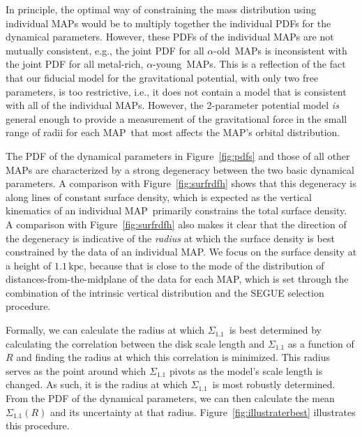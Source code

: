 \documentclass{emulateapj}
\newcommand{\ie}{i.e.}
\renewcommand{\figurename}{Figure}
\newcommand{\apoor}{\ensuremath{\alpha}-young}
\newcommand{\aenhanced}{\ensuremath{\alpha}-old}
\newcommand{\map}{MAP}
\newcommand{\kpc}{\ensuremath{\,\mathrm{kpc}}}
\newcommand{\sigoneone}{\ensuremath{\Sigma_{1.1}}}
\begin{document}
In principle, the optimal way of constraining the mass distribution
using individual \map s would be to multiply together the individual
PDFs for the dynamical parameters. However, these PDFs of the
individual \map s are not mutually consistent, e.g., the joint PDF for
all \aenhanced\ \map s is inconsistent with the joint PDF for all
metal-rich, \apoor\ \map s. This is a reflection of the fact that our
fiducial model for the gravitational potential, with only two free
parameters, is too restrictive, \ie, it does not contain a model that
is consistent with all of the individual \map s. However, the
2-parameter potential model \emph{is} general enough to provide a
measurement of the gravitational force in the small range of radii for
each \map\ that most affects the \map's orbital distribution. 

The PDF of the dynamical parameters in \figurename~\ref{fig:pdfs} and
those of all other \map s are characterized by a strong degeneracy
between the two basic dynamical parameters. A comparison with
\figurename~\ref{fig:surfrdfh} shows that this degeneracy is along
lines of constant surface density, which is expected as the vertical
kinematics of an individual \map\ primarily constrains the total
surface density. A comparison with \figurename~\ref{fig:surfrdfh} also
makes it clear that the direction of the degeneracy is indicative of
the \emph{radius} at which the surface density is best constrained by
the data of an individual \map. We focus on the surface density at a
height of $1.1\kpc$, because that is close to the mode of the
distribution of distances-from-the-midplane of the data for each
\map, which is set through the combination of the intrinsic vertical
distribution and the SEGUE selection procedure.

Formally, we can calculate the radius at which \sigoneone\ is best
determined by calculating the correlation between the disk scale
length and $\sigoneone$ as a function of $R$ and finding the radius at
which this correlation is minimized. This radius serves as the point
around which $\sigoneone$ pivots as the model's scale length is
changed. As such, it is the radius at which \sigoneone\ is most
robustly determined. From the PDF of the dynamical parameters, we can
then calculate the mean $\sigoneone(R)$ and its uncertainty at that
radius. \figurename~\ref{fig:illustraterbest} illustrates this
procedure.
\end{document}
